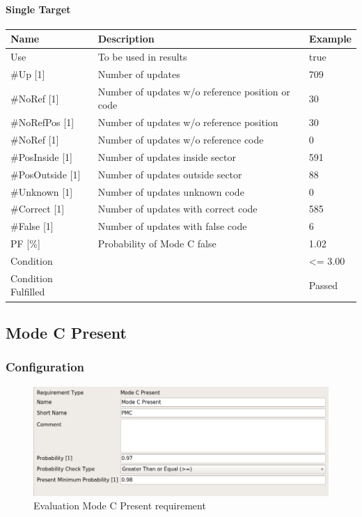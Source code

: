 \paragraph{Single Target}

\begin{center}
 \begin{table}[H]
  \begin{tabularx}{\textwidth}{ | l | X |  l | }
    \hline
    \textbf{Name} & \textbf{Description} & \textbf{Example} \\ \hline
    Use & To be used in results & true \\ \hline
    \#Up [1] & Number of updates & 709 \\ \hline
    \#NoRef [1] & Number of updates w/o reference position or code & 30 \\ \hline
    \#NoRefPos [1] & Number of updates w/o reference position  & 30 \\ \hline
    \#NoRef [1] & Number of updates w/o reference code & 0 \\ \hline
    \#PosInside [1] & Number of updates inside sector & 591 \\ \hline
    \#PosOutside [1] & Number of updates outside sector & 88 \\ \hline
    \#Unknown [1] & Number of updates unknown code & 0 \\ \hline
    \#Correct [1] & Number of updates with correct code & 585 \\ \hline
    \#False [1] & Number of updates with false code & 6 \\ \hline
    PF [\%] & Probability of Mode C false & 1.02 \\ \hline
    Condition &  & <= 3.00 \\ \hline
    Condition Fulfilled &  & Passed \\ \hline
\end{tabularx}
\end{table}
\end{center}

\subsection{Mode C Present}
\label{sec:eval_req_mc_present} 

\subsubsection{Configuration}

\begin{figure}[H]
    \includegraphics[width=14cm,frame]{figures/eval_req_mc_present.png}
  \caption{Evaluation Mode C Present requirement}
\end{figure}

